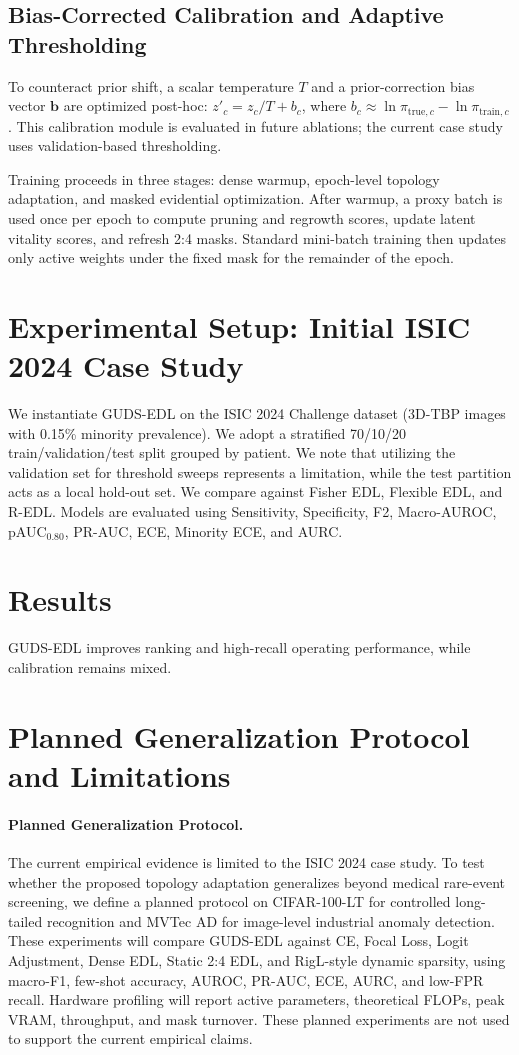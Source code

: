 \documentclass[letterpaper]{article} %
\begin{document}
\subsection{Bias-Corrected Calibration and Adaptive Thresholding}
To counteract prior shift, a scalar temperature $T$ and a prior-correction bias vector $\bm{b}$ are optimized post-hoc: $z'_c = z_c/T + b_c$, where $b_c \approx \ln \pi_{\text{true},c} - \ln \pi_{\text{train},c}$. This calibration module is evaluated in future ablations; the current case study uses validation-based thresholding. 

Training proceeds in three stages: dense warmup, epoch-level topology adaptation, and masked evidential optimization. After warmup, a proxy batch is used once per epoch to compute pruning and regrowth scores, update latent vitality scores, and refresh 2:4 masks. Standard mini-batch training then updates only active weights under the fixed mask for the remainder of the epoch.

\section{Experimental Setup: Initial ISIC 2024 Case Study}
We instantiate GUDS-EDL on the ISIC 2024 Challenge dataset (3D-TBP images with 0.15\% minority prevalence). We adopt a stratified 70/10/20 train/validation/test split grouped by patient. We note that utilizing the validation set for threshold sweeps represents a limitation, while the test partition acts as a local hold-out set. We compare against Fisher EDL, Flexible EDL, and R-EDL. Models are evaluated using Sensitivity, Specificity, F2, Macro-AUROC, pAUC$_{0.80}$, PR-AUC, ECE, Minority ECE, and AURC.

\section{Results}
GUDS-EDL improves ranking and high-recall operating performance, while calibration remains mixed.



\section{Planned Generalization Protocol and Limitations}
\paragraph{Planned Generalization Protocol.} The current empirical evidence is limited to the ISIC 2024 case study. To test whether the proposed topology adaptation generalizes beyond medical rare-event screening, we define a planned protocol on CIFAR-100-LT for controlled long-tailed recognition and MVTec AD for image-level industrial anomaly detection. These experiments will compare GUDS-EDL against CE, Focal Loss, Logit Adjustment, Dense EDL, Static 2:4 EDL, and RigL-style dynamic sparsity, using macro-F1, few-shot accuracy, AUROC, PR-AUC, ECE, AURC, and low-FPR recall. Hardware profiling will report active parameters, theoretical FLOPs, peak VRAM, throughput, and mask turnover. These planned experiments are not used to support the current empirical claims.
\end{document}
